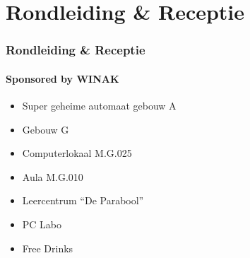 %    
%    
%

\section{Rondleiding \& Receptie}
\begin{frame}
	\frametitle{Rondleiding \& Receptie}
	\framesubtitle{Sponsored by WINAK}
    \begin{itemize}
    	\item Super geheime automaat gebouw A
       	\item Gebouw G
	    \item Computerlokaal M.G.025
	    \item Aula M.G.010
        \item Leercentrum ``De Parabool''
        \item PC Labo
        \item Free Drinks
	\end{itemize}
\end{frame}
